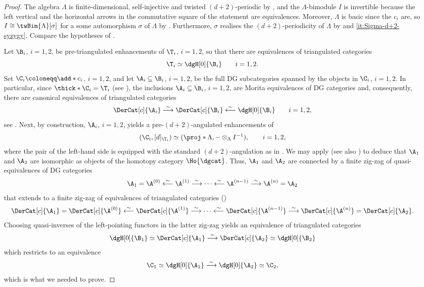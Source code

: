 \documentclass[a4paper]{amsart}
\begin{document}
  \begin{proof}
  The algebra $\Lambda$ is finite-dimensional, self-injective and twisted $(d+2)$-periodic by , and the $\Lambda$-bimodule $I$ is invertible because the left vertical and the horizontal arrows in the commutative square of the statement are equivalences. Moreover, $\Lambda$ is basic since the $c_i$ are, so $I\cong\twBim{\Lambda}[\sigma]$ for a some automorphism $\sigma$ of $\Lambda$ by \cite[Prop.~3.8]{Bol84}. Furthermore, $\sigma$ realises the $(d+2)$-periodicity of $\Lambda$ by  and \eqref{it:Sigma-d+2-syzygy}. Compare the hypotheses of .
  
  Let
  $\B_i$, $i=1,2$, be pre-triangulated enhancements of $\T_i$, $i=1,2$, so
  that there are equivalences of triangulated categories
  \[
    \T_i\simeq\dgH[0]{\B_i}\qquad i=1,2.
  \]
  Set $\C_i\coloneqq\add*{c_i}$, $i=1,2$, and let $\A_i\subseteq\B_i$, $i=1,2$,
  be the full DG subcategories spanned by the objects in $\C_i$, $i=1,2$. In
  particular, since $\thick*{\C_i}=\T_i$ (see ), the
  inclusions $\A_i\subseteq\B_i$, $i=1,2$, are Morita equivalences of DG
  categories and, consequently, there are canonical equivalences of triangulated
  categories
  \[
    \DerCat[c]{\A_i}\stackrel{\sim}{\longrightarrow}\DerCat[c]{\B_i}\stackrel{\sim}{\longleftarrow}\dgH[0]{\B_i}\qquad
    i=1,2,
  \]
  see . Next, by construction, $\A_i$, $i=1,2$, yields a
  pre-$(d+2)$-angulated enhancements of
  \[
    (\C_i,[d]_{\T_i})\simeq(\proj*{\Lambda},-\otimes_{\Lambda}I^{-1}),\qquad
    i=1,2,
  \]
  where the pair of the left-hand side is equipped with the standard
  $(d+2)$-angulation as in . We may apply
   (see also ) to deduce that $\A_1$ and
  $\A_2$ are isomorphic as objects of the homotopy category $\Ho{\dgcat}$. Thus,
  $\A_1$ and $\A_2$ are connected by a finite zig-zag of quasi-equivalences of
  DG categories
  \begin{equation}
    \label{eq:zigzag}
    \A_1=\A^{(0)}\stackrel{\sim}{\longleftarrow}\A^{(1)}\stackrel{\sim}{\longrightarrow}\cdots\stackrel{\sim}{\longleftarrow}\A^{(n-1)}\stackrel{\sim}{\longrightarrow}\A^{(n)}=\A_2
  \end{equation}
  that extends to a finite zig-zag of equivalences of triangulated categories
  ()
  \[
    \DerCat[c]{\A_1}=\DerCat[c]{\A^{(0)}}\stackrel{\sim}{\longleftarrow}\DerCat[c]{\A^{(1)}}\stackrel{\sim}{\longrightarrow}\cdots\stackrel{\sim}{\longleftarrow}\DerCat[c]{\A^{(n-1)}}\stackrel{\sim}{\longrightarrow}\DerCat[c]{\A^{(n)}}=\DerCat[c]{\A_2}.
  \]
  Choosing quasi-inverses of the left-pointing functors in the latter zig-zag
  yields an equivalence of triangulated categories
  \[
    \dgH[0]{\B_1}\simeq\DerCat[c]{\A_1}\stackrel{\sim}{\longrightarrow}\DerCat[c]{\A_2}\simeq\dgH[0]{\B_2}
  \]
  which restricts to an equivalence
  \[
    \C_1\simeq\dgH[0]{\A_1}\stackrel{\sim}{\longrightarrow}\dgH[0]{\A_2}\simeq\C_2,
  \]
  which is what we needed to prove.
\end{proof}
\end{document}

